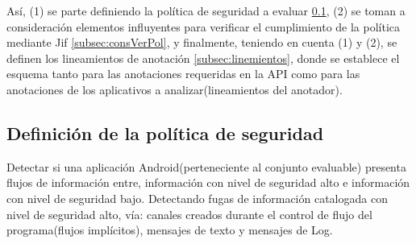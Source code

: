 % 
% 

Así, (1) se parte definiendo la política de seguridad a evaluar
\ref{subsection:politica}, (2) se toman a consideración elementos influyentes
para verificar el cumplimiento de la política mediante Jif
\ref{subsec:consVerPol}, y finalmente, teniendo en cuenta (1) y (2), se definen
los lineamientos de anotación \ref{subsec:linemientos}, donde se establece el
esquema tanto para las anotaciones requeridas en la API como para las
anotaciones de los aplicativos a analizar(lineamientos del anotador).

\subsection{Definición de la política de seguridad}
\label{subsection:politica}
Detectar si una aplicación Android(perteneciente al conjunto evaluable) presenta
flujos de información entre, información con nivel de seguridad alto e
información con nivel de seguridad bajo.\newline
Detectando fugas de información catalogada con nivel de seguridad alto, vía:
canales creados durante el control de flujo del programa(flujos implícitos),
mensajes de texto y mensajes de Log.\newline 

